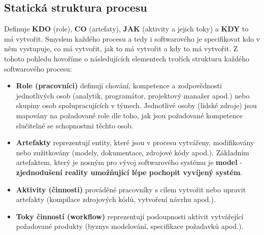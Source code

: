 \subsection{Statická struktura procesu}
Definuje \textbf{KDO} (role), \textbf{CO} (artefaty), \textbf{JAK} (aktivity a jejich toky) a \textbf{KDY} to má vytvořit. Smyslem každého procesu a tedy i softwarového je specifikovat kdo v něm vystupuje, co má vytvořit, jak to má vytvořit a kdy to má vytvořit.  Z tohoto pohledu hovoříme o následujících elementech tvořích strukturu každého softwarového procesu:
\begin{itemize}
    \item \textbf{Role (pracovníci)} definují chování, kompetence a zodpovědnosti jednotlivých osob (analytik, programátor, projektový manažer apod.) nebo skupiny osob spolupracujících v týmech.  Jednotlivé osoby (lidské zdroje) jsou mapovány na požadované role dle toho, jak jsou požadované kompetence slučitelné se schopnostmi těchto osob.
    \item \textbf{Artefakty} reprezentují entity, které jsou v procesu vytvářeny, modifikovány nebo zužitkovány (modely, dokumentace, zdrojové kódy apod.).  Základním artefaktem, který je nosným pro vývoj softwarového systému je \textbf{model} - \textbf{zjednodušení reality umožňující lépe pochopit vyvíjený systém}.
    \item \textbf{Aktivity (činnosti)} prováděné pracovníky s cílem vytvořit nebo upravit artefakty (kompilace zdrojových kódů, vytvoření návrhu apod.).
    \item \textbf{Toky činností (workflow)} reprezentují posloupnosti aktivit vytvářející požadované produkty (byznys modelování, specifikace požadavků apod.).
\end{itemize}

